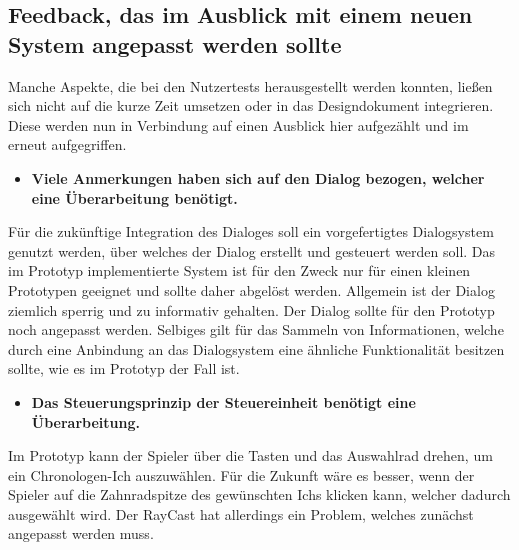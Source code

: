 \subsection{Feedback, das im Ausblick mit einem neuen System angepasst werden sollte}
Manche Aspekte, die bei den Nutzertests herausgestellt werden konnten, ließen sich nicht auf die kurze Zeit umsetzen oder in das Designdokument integrieren. Diese werden nun in Verbindung auf einen Ausblick hier aufgezählt und im  erneut aufgegriffen.


\begin{itemize}  
    \item \textbf{Viele Anmerkungen haben sich auf den Dialog bezogen, welcher eine Überarbeitung benötigt.}
\end{itemize}

Für die zukünftige Integration des Dialoges soll ein vorgefertigtes Dialogsystem genutzt werden, über welches der Dialog erstellt und gesteuert werden soll. Das im Prototyp implementierte System ist für den Zweck nur für einen  kleinen Prototypen geeignet und sollte daher abgelöst werden. Allgemein ist der Dialog ziemlich sperrig und zu informativ gehalten. Der Dialog sollte für den Prototyp noch angepasst werden. 
Selbiges gilt für das Sammeln von Informationen, welche durch eine Anbindung an das Dialogsystem eine ähnliche Funktionalität besitzen sollte, wie es im Prototyp der Fall ist.

\begin{itemize}  
    \item \textbf{Das Steuerungsprinzip der Steuereinheit benötigt eine Überarbeitung.}
\end{itemize}

Im Prototyp kann der Spieler über die Tasten  und  das Auswahlrad drehen, um ein Chronologen-Ich auszuwählen. Für die Zukunft wäre es besser, wenn der Spieler auf die Zahnradspitze des gewünschten Ichs klicken kann, welcher dadurch ausgewählt wird. Der RayCast hat allerdings ein Problem, welches zunächst angepasst werden muss.

